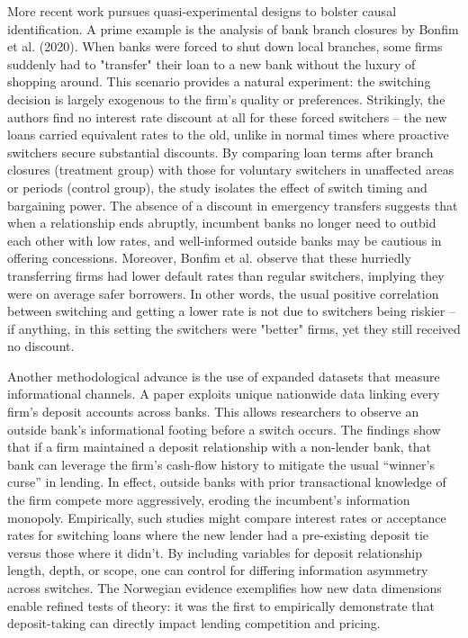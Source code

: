 More recent work pursues quasi-experimental designs to bolster causal identification. A prime example is the analysis of bank branch closures by Bonfim et al. (2020). When banks were forced  to shut down local branches, some firms suddenly had to "transfer" their loan to a new bank without the luxury of shopping around. This scenario provides a natural experiment: the switching decision is largely exogenous to the firm's quality or preferences. Strikingly, the authors find no interest rate discount at all for these forced switchers -- the new loans carried equivalent rates to the old, unlike in normal times where proactive switchers secure substantial discounts. By comparing loan terms after branch closures (treatment group) with those for voluntary switchers in unaffected areas or periods (control group), the study isolates the effect of switch timing and bargaining power. The absence of a discount in emergency transfers suggests that when a relationship ends abruptly, incumbent banks no longer need to outbid each other with low rates, and well-informed outside banks may be cautious in offering concessions. Moreover, Bonfim et al. observe that these hurriedly transferring firms had lower default rates than regular switchers, implying they were on average safer borrowers. In other words, the usual positive correlation between switching and getting a lower rate is not due to switchers being riskier -- if anything, in this setting the switchers were "better" firms, yet they still received no discount. 

Another methodological advance is the use of expanded datasets that  measure informational channels. A paper exploits unique nationwide data linking every firm's deposit accounts across banks. This allows researchers to observe an outside bank's informational footing before a switch occurs. The findings show that if a firm maintained a deposit relationship with a non-lender bank, that bank can leverage the firm's cash-flow history to mitigate the usual “winner's curse” in lending. In effect, outside banks with prior transactional knowledge of the firm compete more aggressively, eroding the incumbent's information monopoly. Empirically, such studies might compare interest rates or acceptance rates for switching loans where the new lender had a pre-existing deposit tie versus those where it didn't. By including variables for deposit relationship length, depth, or scope, one can control for differing information asymmetry across switches. The Norwegian evidence exemplifies how new data dimensions enable refined tests of theory: it was the first to empirically demonstrate that deposit-taking can directly impact lending competition and pricing. 

